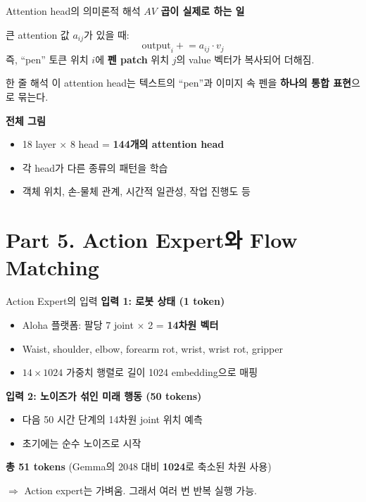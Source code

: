 \documentclass[aspectratio=169,10pt]{beamer}
\begin{document}
\begin{frame}{Attention head의 의미론적 해석}
\textbf{$AV$ 곱이 실제로 하는 일}

\vspace{0.5em}
큰 attention 값 $a_{ij}$가 있을 때:
\[
\mathrm{output}_i \mathrel{+}= a_{ij} \cdot v_j
\]
즉, ``pen'' 토큰 위치 $i$에 \textbf{펜 patch} 위치 $j$의 value 벡터가 \alert{복사}되어 더해짐.

\vspace{0.8em}
\begin{block}{한 줄 해석}
이 attention head는 텍스트의 ``pen''과 이미지 속 펜을 \textbf{하나의 통합 표현}으로 묶는다.
\end{block}

\vspace{0.6em}
\textbf{전체 그림}
\begin{itemize}
  \item 18 layer $\times$ 8 head = \textbf{144개의 attention head}
  \item 각 head가 다른 종류의 패턴을 학습
  \item 객체 위치, 손-물체 관계, 시간적 일관성, 작업 진행도 등
\end{itemize}
\end{frame}

\section{Part 5. Action Expert와 Flow Matching}

\begin{frame}{Action Expert의 입력}
\textbf{입력 1: 로봇 상태 (1 token)}
\begin{itemize}
  \item Aloha 플랫폼: 팔당 7 joint $\times$ 2 = \textbf{14차원 벡터}
  \item Waist, shoulder, elbow, forearm rot, wrist, wrist rot, gripper
  \item $14 \times 1024$ 가중치 행렬로 길이 \alert{1024} embedding으로 매핑
\end{itemize}

\vspace{0.8em}
\textbf{입력 2: 노이즈가 섞인 미래 행동 (50 tokens)}
\begin{itemize}
  \item 다음 50 시간 단계의 14차원 joint 위치 예측
  \item \alert{초기에는 순수 노이즈}로 시작
\end{itemize}

\vspace{0.8em}
\textbf{총 51 tokens} (Gemma의 2048 대비 \textbf{1024}로 축소된 차원 사용)

\vspace{0.4em}
\footnotesize
$\Rightarrow$ Action expert는 가벼움. 그래서 여러 번 반복 실행 가능.
\end{frame}
\end{document}
